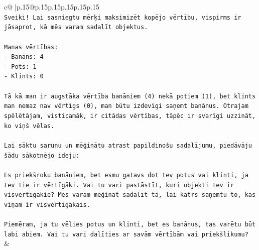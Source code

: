 \documentclass{article}
\begin{document}
{\begin{supertabular}{c@{$\;$}|p{.15\linewidth}@{}p{.15\linewidth}p{.15\linewidth}p{.15\linewidth}p{.15\linewidth}p{.15\linewidth}}
{{{\\ 
\texttt{Sveiki! Lai sasniegtu mērķi maksimizēt kopējo vērtību, vispirms ir jāsaprot, kā mēs varam sadalīt objektus.} \\
\\ 
\texttt{Manas vērtības:} \\
\texttt{{-} Banāns: 4} \\
\texttt{{-} Pots: 1} \\
\texttt{{-} Klints: 0} \\
\\ 
\texttt{Tā kā man ir augstāka vērtība banāniem (4) nekā potiem (1), bet klints man nemaz nav vērtīgs (0), man būtu izdevīgi saņemt banānus. Otrajam spēlētājam, visticamāk, ir citādas vērtības, tāpēc ir svarīgi uzzināt, ko viņš vēlas.} \\
\\ 
\texttt{Lai sāktu sarunu un mēģinātu atrast papildinošu sadalījumu, piedāvāju šādu sākotnējo ideju:} \\
\\ 
\texttt{Es priekšroku banāniem, bet esmu gatavs dot tev potus vai klinti, ja tev tie ir vērtīgāki. Vai tu vari pastāstīt, kuri objekti tev ir visvērtīgākie? Mēs varam mēģināt sadalīt tā, lai katrs saņemtu to, kas viņam ir visvērtīgākais.} \\
\\ 
\texttt{Piemēram, ja tu vēlies potus un klinti, bet es banānus, tas varētu būt labi abiem. Vai tu vari dalīties ar savām vērtībām vai priekšlikumu?} \\
            }
        }
    }
    & \\ \\


\end{supertabular}}
\end{document}
